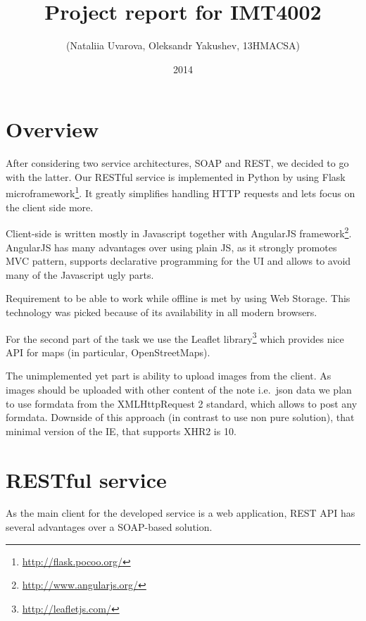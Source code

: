 \documentclass[12pt,a4paper]{article}
\begin{document}
\lstset{numbers=left,tabsize=4,breaklines=true,title=\lstname,}
\title{Project report for IMT4002}
\author{(Nataliia Uvarova, Oleksandr Yakushev, 13HMACSA)}
\date{2014}
\maketitle
\onehalfspacing

\section{Overview}

After considering two service architectures, SOAP and REST, we decided
to go with the latter. Our RESTful service is implemented in Python by
using Flask microframework\footnote{\url{http://flask.pocoo.org/}}.
It greatly simplifies handling HTTP requests and lets focus on the
client side more.

Client-side is written mostly in Javascript together with AngularJS
framework\footnote{\url{http://www.angularjs.org/}}. AngularJS has
many advantages over using plain JS, as it strongly promotes MVC
pattern, supports declarative programming for the UI and allows to
avoid many of the Javascript ugly parts.

Requirement to be able to work while offline is met by using Web Storage.
This technology was picked because of its availability in all modern browsers.

For the second part of the task we use the Leaflet
library\footnote{\url{http://leafletjs.com/}} which provides nice API
for maps (in particular, OpenStreetMaps).

The unimplemented yet part is ability to upload images from the client. As images should be
uploaded with other content of the note i.e.\  json data we plan to use formdata from
the XMLHttpRequest 2 standard, which allows to post any formdata. Downside of this approach (in contrast to use
non pure solution), that minimal version of the IE, that supports XHR2 is 10.

\section{RESTful service}

As the main client for the developed service is a web application,
REST API has several advantages over a SOAP-based solution.
\end{document}
